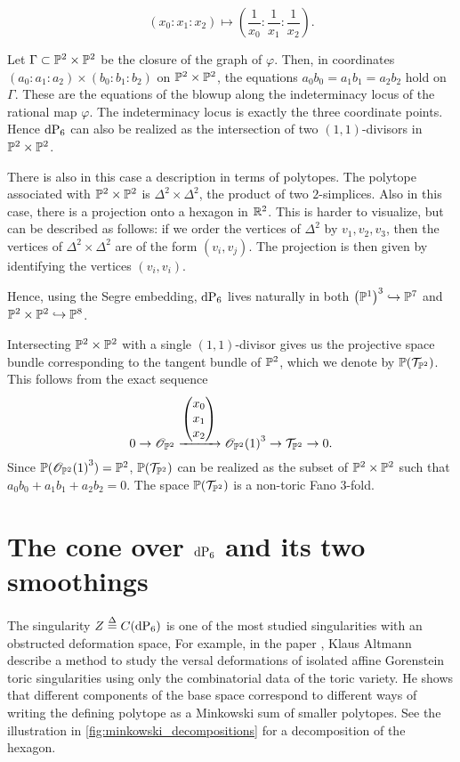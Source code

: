 \[
(x_0:x_1:x_2) \mapsto \left( \frac 1{x_0}: \frac 1{x_1}:\frac 1{x_2} \right).
\]

Let $\Gamma \subset \P^2 \times \P^2$ be the closure of the graph of $\varphi$. Then, in coordinates ${(a_0:a_1:a_2) \times(b_0:b_1:b_2)}$ on $\P^2 \times \P^2$, the equations $a_0b_0=a_1b_1=a_2b_2$ hold \label{eq:dp6_inp2p2} on $\Gamma$. These are the equations of the blowup along the indeterminacy locus of the rational map $\varphi$. The indeterminacy locus is exactly the three coordinate points. Hence $\dP6$ can also be realized as the intersection of two $(1,1)$-divisors in $\P^2 \times \P^2$. 

There is also in this case a description in terms of polytopes. The polytope associated with $\P^2 \times \P^2$ is $\Delta^2 \times \Delta^2$, the product of two $2$-simplices. Also in this case, there is a projection onto a hexagon in $\R^2$. This is harder to visualize, but can be described as follows: if we order the vertices of $\Delta^2$ by $v_1,v_2,v_3$, then the vertices of $\Delta^2 \times \Delta^2$ are of the form $(v_i,v_j)$. The projection is then given by identifying the vertices $(v_i,v_i)$. 

Hence, using the Segre embedding, $\dP6$ lives naturally in both ${\left( \P^1 \right)}^3 \hookrightarrow \P^7$ and $\P^2 \times \P^2 \hookrightarrow \P^8$. 

\begin{remark}
Intersecting $\P^2 \times \P^2$ with a single $(1,1)$-divisor gives us the projective space bundle corresponding to the tangent bundle of $\P^2$, which we denote by $\P(\mathcal T_{\P^2})$. This follows from the exact sequence
\[
0 \to \OO_{\P^2} \xrightarrow{\begin{pmatrix}x_0 \\ x_1 \\ x_2\end{pmatrix}} {\OO_{\P^2}(1)}^3 \to \mathcal T_{\P^2} \to 0.
\]
Since $\P({\OO_{\P^2}(1)}^3)=\P^2$,  $\P(\mathcal T_{\P^2})$ can be realized as the subset of $\P^2 \times \P^2$ such that $a_0b_0+a_1b_1+a_2b_2=0$. The space $\P(\mathcal T_{\P^2})$ is a non-toric Fano 3-fold.
\end{remark}


\section{The cone over \texorpdfstring{$\dP6$}{dP6} and its two smoothings}

The singularity $Z\stackrel{\Delta}{=} C(\dP6)$ is one of the most studied singularities with an obstructed deformation space, For example, in the paper \cite{altmann_versaldeformation}, Klaus Altmann describe a method to study the versal deformations of isolated affine Gorenstein toric singularities using only the combinatorial data of the toric variety. He shows that different components of the base space correspond to different ways of writing the defining polytope as a Minkowski sum of smaller polytopes. See the illustration in \cref{fig:minkowski_decompositions} for a decomposition of the hexagon.


